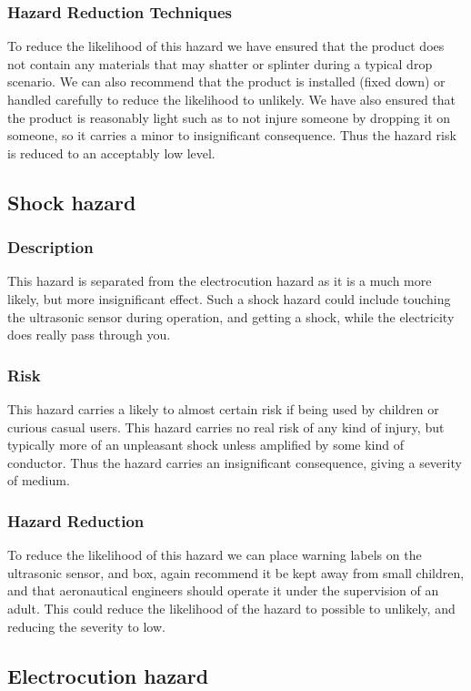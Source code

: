 \documentclass[]{report}
\begin{document}
\subsubsection{Hazard Reduction Techniques}
To reduce the likelihood of this hazard we have ensured that the product does not contain any materials that may shatter or splinter during a typical drop scenario. We can also recommend that the product is installed (fixed down) or handled carefully to reduce the likelihood to unlikely. We have also ensured that the product is reasonably light such as to not injure someone by dropping it on someone, so it carries a minor to insignificant consequence. Thus the hazard risk is reduced to an acceptably low level.

\subsection{Shock hazard}
\subsubsection{Description}
This hazard is separated from the electrocution hazard as it is a much more likely, but more insignificant effect. Such a shock hazard could include touching the ultrasonic sensor during operation, and getting a shock, while the electricity does really pass through you.

\subsubsection{Risk}
This hazard carries a likely to almost certain risk if being used by children or curious casual users. This hazard carries no real risk of any kind of injury, but typically more of an unpleasant shock unless amplified by some kind of conductor. Thus the hazard carries an insignificant consequence, giving a severity of medium.

\subsubsection{Hazard Reduction}
To reduce the likelihood of this hazard we can place warning labels on the ultrasonic sensor, and box, again recommend it be kept away from small children, and that aeronautical engineers should operate it under the supervision of an adult. This could reduce the likelihood of the hazard to possible to unlikely, and reducing the severity to low.

\subsection{Electrocution hazard}
\end{document}
